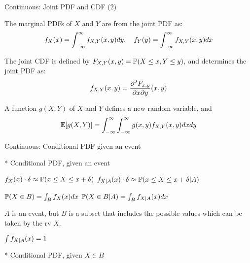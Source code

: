\documentclass[fleqn,aspectratio=169]{beamer}
\begin{document}
\begin{frame}{Continuous: Joint PDF and CDF (2)}

\plitemsep 0.1in
\bce
\item<2->[2.] The marginal PDFs of $X$ and $Y$ are from the joint PDF as: 
$$
f_X(x) = \int_{-\infty}^\infty f_{X,Y}(x,y) dy, \quad f_Y(y) = \int_{-\infty}^\infty f_{X,Y}(x,y) dx
$$

\item<3->[3.] The joint CDF is defined by $F_{X,Y}(x,y) = \mathbb{P}( X \le x, Y \le y ),$ and determines the joint PDF as:
$$
f_{X,Y}(x,y) = \frac{\partial^2 F_{x,y}}{\partial x \partial y} (x,y)
$$

\item<4->[4.] A function $g(X,Y)$ of $X$ and $Y$ defines a new random variable, and
$$
\mathbb{E}[ g(X,Y) ] = \int_{-\infty}^\infty \int_{-\infty}^\infty g(x,y) f_{X,Y}(x,y) dx dy
$$
\ece

\end{frame}

\begin{frame}{Continuous:  Conditional PDF given an event}

{
* Conditional PDF, given an event 

\medskip

\plitemsep 0.15in
\bci 
\item<2-> $f_X(x) \cdot \delta \approx \mathbb{P}( x \le X \le x+\delta )$
$f_{X|A}(x) \cdot \delta \approx \mathbb{P}( x \le X \le x+\delta | A )$

\item<3-> $\mathbb{P}( X \in B ) = \int_B f_X(x) dx$
$\mathbb{P}( X \in B | A ) = \int_B f_{X|A}(x) dx$

\medskip
{} $A$ is an event, but $B$ is a subset that includes the possible values which can be taken by the rv $X.$

\item<4-> $\int f_{X|A}(x) = 1$
\eci
}
{
* Conditional PDF, given $X \in B$

\medskip



}
\end{frame}
\end{document}
